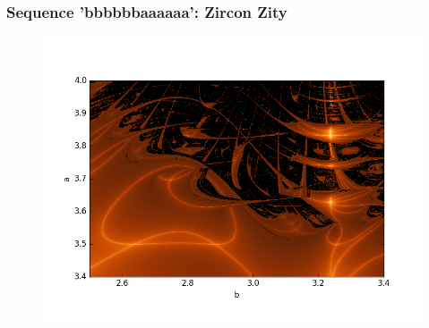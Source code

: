 \documentclass[ignorenonframetext]{beamer}
\begin{document}
\begin{frame}
\frametitle{Sequence 'bbbbbbaaaaaa': Zircon Zity}
\begin{figure}[htbp]
\includegraphics[scale = 0.5]{pictures/zircon_city.png}
\end{figure}
\end{frame}

\begin{frame}
\\
\\
\end{frame}
\end{document}
